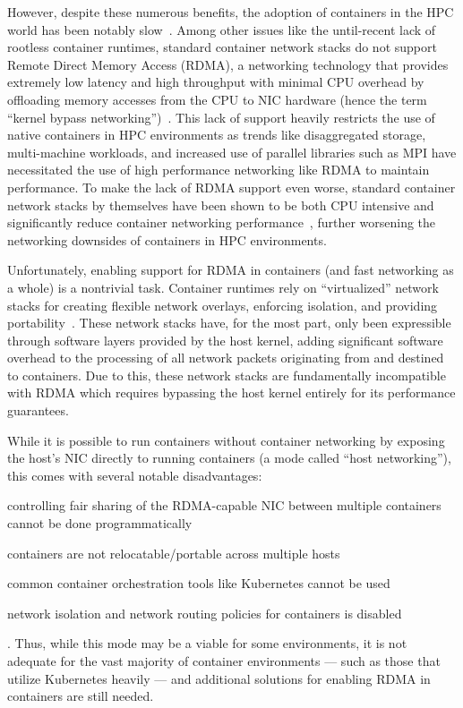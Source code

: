 \documentclass[12pt,titlepage]{article}
\begin{document}
However, despite these numerous benefits, the adoption of containers in the HPC world has been notably slow~\cite{hpcappscontainers}.
Among other issues like the until-recent lack of rootless container runtimes, standard container network stacks do not support Remote Direct Memory Access (RDMA), a networking technology that provides extremely low latency and high throughput with minimal CPU overhead by offloading memory accesses from the CPU to NIC hardware (hence the term ``kernel bypass networking'')~\cite{mellanoxrocerdmabenefits}.
This lack of support heavily restricts the use of native containers in HPC environments as trends like disaggregated storage, multi-machine workloads, and increased use of parallel libraries such as MPI have necessitated the use of high performance networking like RDMA to maintain performance.
To make the lack of RDMA support even worse, standard container network stacks by themselves have been shown to be both CPU intensive and significantly reduce container networking performance~\cite{abbasi2019performance,xavier2013performance,lee2018impact,zhao2017performance,kapovcius2020performance}, further worsening the networking downsides of containers in HPC environments.

Unfortunately, enabling support for RDMA in containers (and fast networking as a whole) is a nontrivial task.
Container runtimes rely on ``virtualized'' network stacks for creating flexible network overlays, enforcing isolation, and providing portability~\cite{xavier2013performance}.
These network stacks have, for the most part, only been expressible through software layers provided by the host kernel, adding significant software overhead to the processing of all network packets originating from and destined to containers.
Due to this, these network stacks are fundamentally incompatible with RDMA which requires bypassing the host kernel entirely for its performance guarantees.

While it is possible to run containers without container networking by exposing the host's NIC directly to running containers (a mode called ``host networking''), this comes with several notable disadvantages:
\begin{enumerate*}[label={(\arabic*)},itemjoin*={{, and }},itemjoin={{, }}]
	\item controlling fair sharing of the RDMA-capable NIC between multiple containers cannot be done programmatically
	\item containers are not relocatable/portable across multiple hosts
	\item common container orchestration tools like Kubernetes cannot be used
	\item network isolation and network routing policies for containers is disabled
\end{enumerate*}.
Thus, while this mode may be a viable for some environments, it is not adequate for the vast majority of container environments --- such as those that utilize Kubernetes heavily --- and additional solutions for enabling RDMA in containers are still needed.
\end{document}
